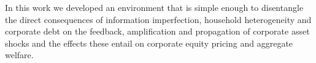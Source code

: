 \documentclass[11pt]{article}
\begin{document}
In this work we developed an environment that is simple enough to disentangle the direct consequences of information imperfection, household heterogeneity and corporate debt on the feedback, amplification and propagation of corporate asset shocks and the effects these entail on corporate equity pricing and aggregate welfare.\\
\end{document}
